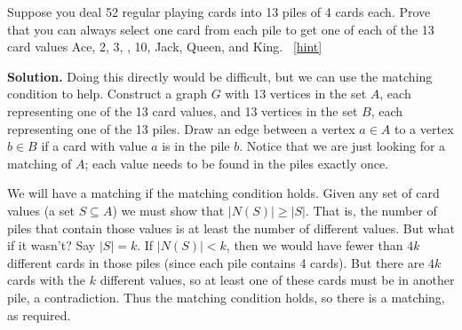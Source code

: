 \documentclass{book}
\begin{document}
\setcounter{project}{61}
\addtocounter{project}{-1}
\begin{activity}[]\label{activity-54}
\hypertarget{p-486}{}%
Suppose you deal 52 regular playing cards into 13 piles of 4 cards each. Prove that you can always select one card from each pile to get one of each of the 13 card values Ace, 2, 3, \textellipsis{}, 10, Jack, Queen, and King.%
~\hfill{\tiny\hyperlink{a-61}{[hint]}\hypertarget{q-61}{}}\par\smallskip%
\noindent\textbf{Solution.}\hypertarget{solution-53}{}\quad%
\hypertarget{p-488}{}%
Doing this directly would be difficult, but we can use the matching condition to help. Construct a graph \(G\) with 13 vertices in the set \(A\), each representing one of the 13 card values, and 13 vertices in the set \(B\), each representing one of the 13 piles. Draw an edge between a vertex \(a \in A\) to a vertex \(b \in B\) if a card with value \(a\) is in the pile \(b\). Notice that we are just looking for a matching of \(A\); each value needs to be found in the piles exactly once.%
\par
\hypertarget{p-489}{}%
We will have a matching if the matching condition holds. Given any set of card values (a set \(S \subseteq A\)) we must show that \(|N(S)| \ge |S|\). That is, the number of piles that contain those values is at least the number of different values. But what if it wasn't? Say \(|S| = k\). If \(|N(S)| \lt  k\), then we would have fewer than \(4k\) different cards in those piles (since each pile contains 4 cards). But there are \(4k\) cards with the \(k\) different values, so at least one of these cards must be in another pile, a contradiction. Thus the matching condition holds, so there is a matching, as required.%
\end{activity}
\end{document}
